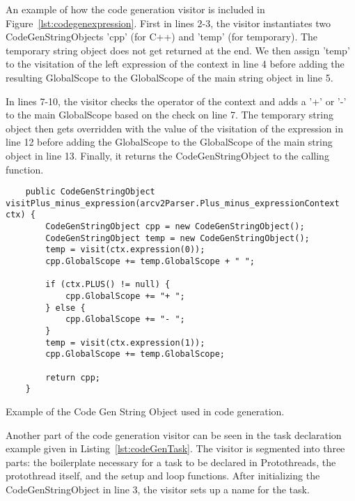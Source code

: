 An example of how the code generation visitor is included in Figure~\ref{lst:codegenexpression}. First in lines 2-3, the visitor instantiates two CodeGenStringObjects 'cpp' (for C++) and 'temp' (for temporary). The temporary string object does not get returned at the end. We then assign 'temp' to the visitation of the left expression of the context in line 4 before adding the resulting GlobalScope to the GlobalScope of the main string object in line 5.

In lines 7-10, the visitor checks the operator of the context and adds a '+' or '-' to the main GlobalScope based on the check on line 7. The temporary string object then gets overridden with the value of the visitation of the expression in line 12 before adding the GlobalScope to the GlobalScope of the main string object in line 13. Finally, it returns the CodeGenStringObject to the calling function.


\begin{listing}[htb!]
    \begin{verbatim}
    public CodeGenStringObject visitPlus_minus_expression(arcv2Parser.Plus_minus_expressionContext ctx) {
        CodeGenStringObject cpp = new CodeGenStringObject();
        CodeGenStringObject temp = new CodeGenStringObject();
        temp = visit(ctx.expression(0));
        cpp.GlobalScope += temp.GlobalScope + " ";

        if (ctx.PLUS() != null) {
            cpp.GlobalScope += "+ ";
        } else {
            cpp.GlobalScope += "- ";
        }
        temp = visit(ctx.expression(1));
        cpp.GlobalScope += temp.GlobalScope;

        return cpp;
    }
    \end{verbatim}
    \caption{Example of the Code Gen String Object used in code generation.}
    \label{lst:codegenexpression}
\end{listing}


Another part of the code generation visitor can be seen in the task declaration example given in Listing~\ref{lst:codeGenTask}. The visitor is segmented into three parts: the boilerplate necessary for a task to be declared in Protothreads, the protothread itself, and the setup and loop functions. After initializing the CodeGenStringObject in line 3, the visitor sets up a name for the task.


